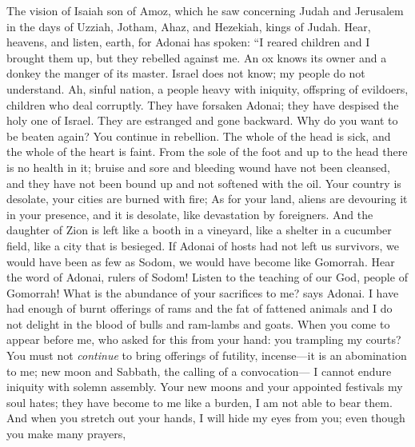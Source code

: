 
\begin{biblechapter} %
 The vision of Isaiah son of Amoz, which he saw concerning Judah and Jerusalem in the days of Uzziah, Jotham, Ahaz, and Hezekiah, kings of Judah.
 Hear, heavens, 
and listen, earth, 
for Adonai has spoken: 
“I reared children 
and I brought them up, 
but they rebelled against me.
\verse An ox knows its owner 
and a donkey the manger of its master. 
Israel does not know; 
my people do not understand.
\verse Ah, sinful nation, 
a people heavy with iniquity, 
offspring of evildoers, 
children who deal corruptly. 
They have forsaken Adonai; 
they have despised the holy one of Israel. 
They are estranged and gone backward.
\verse Why do you want to be beaten again? 
You continue in rebellion. 
The whole of the head is sick, 
and the whole of the heart is faint.
\verse From the sole of the foot and up to the head 
there is no health in it; 
bruise and sore and bleeding wound have not been cleansed, 
and they have not been bound up 
and not softened with the oil.
\verse Your country is desolate, 
your cities are burned with fire; 
As for your land, aliens are devouring it in your presence, 
and it is desolate, like devastation by foreigners.
\verse And the daughter of Zion is left like a booth in a vineyard, 
like a shelter in a cucumber field, 
like a city that is besieged.
\verse If Adonai of hosts had not left us survivors, 
we would have been as few as Sodom, 
we would have become like Gomorrah.
\verse Hear the word of Adonai, rulers of Sodom! 
Listen to the teaching of our God, people of Gomorrah!
\verse What is the abundance of your sacrifices to me? says Adonai. 
I have had enough of burnt offerings of rams 
and the fat of fattened animals 
and I do not delight in the blood of bulls 
and ram-lambs and goats.
\verse When you come to appear before me, 
who asked for this from your hand: 
you trampling my courts?
\verse You must not \textit{continue} to bring offerings of futility, 
incense—it is an abomination to me; 
new moon and Sabbath, the calling of a convocation— 
I cannot endure iniquity with solemn assembly.
\verse Your new moons and your appointed festivals my soul hates; 
they have become to me like a burden, 
I am not able to bear them.
\verse And when you stretch out your hands, 
I will hide my eyes from you; 
even though you make many prayers, 

\end{biblechapter}
